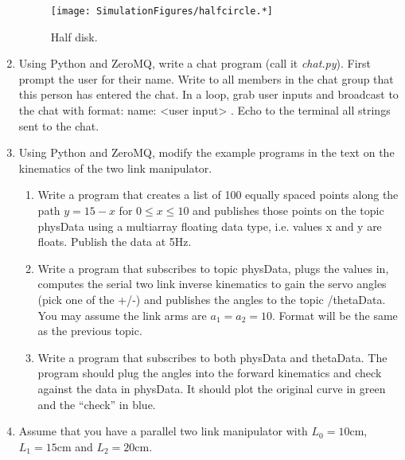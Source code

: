 \begin{enumerate}
  \leavevmode\hypertarget{Fig:shapeforhw}{}%
  \begin{figure}
  \centering
  \texttt{[image: SimulationFigures/halfcircle.*]}
  \caption{Half disk.}
  \end{figure}
\item
  Using Python and ZeroMQ, write a chat program (call it
  \emph{chat.py}). First prompt the user for their name. Write to all
  members in the chat group that this person has entered the chat. In a
  loop, grab user inputs and broadcast to the chat with format: name:
  \textless user input\textgreater{} . Echo to the terminal all strings
  sent to the chat.
\item
  Using Python and ZeroMQ, modify the example programs in the text on
  the kinematics of the two link manipulator.

  \begin{enumerate}
  \tightlist
  \item
    Write a program that creates a list of 100 equally spaced points
    along the path \(y = 15 -  x\) for \(0 \leq x \leq 10\) and
    publishes those points on the topic {physData} using a multiarray
    floating data type, i.e. values x and y are floats. Publish the data
    at 5Hz.
  \item
    Write a program that subscribes to topic {physData}, plugs the
    values in, computes the serial two link inverse kinematics to gain
    the servo angles (pick one of the +/-) and publishes the angles to
    the topic /thetaData. You may assume the link arms are
    \(a_1=a_2 = 10\). Format will be the same as the previous topic.
  \item
    Write a program that subscribes to both {physData} and {thetaData}.
    The program should plug the angles into the forward kinematics and
    check against the data in {physData}. It should plot the original
    curve in green and the ``check'' in blue.
  \end{enumerate}
\item
  Assume that you have a parallel two link manipulator with
  \(L_0 = 10\)cm, \(L_1 = 15\)cm and \(L_2 = 20\)cm.


\end{enumerate}
